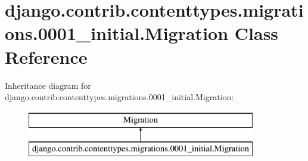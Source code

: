 \hypertarget{classdjango_1_1contrib_1_1contenttypes_1_1migrations_1_10001__initial_1_1_migration}{}\section{django.\+contrib.\+contenttypes.\+migrations.0001\+\_\+initial.Migration Class Reference}
\label{classdjango_1_1contrib_1_1contenttypes_1_1migrations_1_10001__initial_1_1_migration}
Inheritance diagram for django.\+contrib.\+contenttypes.\+migrations.0001\+\_\+initial.Migration\+:\begin{figure}[H]
\begin{center}
\leavevmode
\includegraphics[height=2.000000cm]{classdjango_1_1contrib_1_1contenttypes_1_1migrations_1_10001__initial_1_1_migration}
\end{center}
\end{figure}
